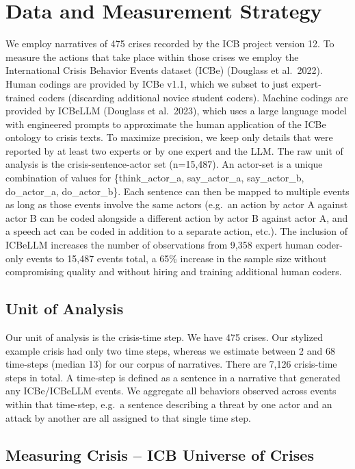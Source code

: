 \documentclass[
]{article}
\begin{document}
\section{Data and Measurement
Strategy}\label{data-and-measurement-strategy}

We employ narratives of 475 crises recorded by the ICB project version
12. To measure the actions that take place within those crises we employ
the International Crisis Behavior Events dataset (ICBe) (Douglass et
al.~2022). Human codings are provided by ICBe v1.1, which we subset to
just expert-trained coders (discarding additional novice student
coders). Machine codings are provided by ICBeLLM (Douglass et al.~2023),
which uses a large language model with engineered prompts to approximate
the human application of the ICBe ontology to crisis texts. To maximize
precision, we keep only details that were reported by at least two
experts or by one expert and the LLM. The raw unit of analysis is the
crisis-sentence-actor set (n=15,487). An actor-set is a unique
combination of values for \{think\_actor\_a, say\_actor\_a,
say\_actor\_b, do\_actor\_a, do\_actor\_b\}. Each sentence can then be
mapped to multiple events as long as those events involve the same
actors (e.g.~an action by actor A against actor B can be coded alongside
a different action by actor B against actor A, and a speech act can be
coded in addition to a separate action, etc.). The inclusion of ICBeLLM
increases the number of observations from 9,358 expert human coder-only
events to 15,487 events total, a 65\% increase in the sample size
without compromising quality and without hiring and training additional
human coders.

\subsection{Unit of Analysis}\label{unit-of-analysis}

Our unit of analysis is the crisis-time step. We have 475 crises. Our
stylized example crisis had only two time steps, whereas we estimate
between 2 and 68 time-steps (median 13) for our corpus of narratives.
There are 7,126 crisis-time steps in total. A time-step is defined as a
sentence in a narrative that generated any ICBe/ICBeLLM events. We
aggregate all behaviors observed across events within that time-step,
e.g.~a sentence describing a threat by one actor and an attack by
another are all assigned to that single time step.

\subsection{Measuring Crisis -- ICB Universe of
Crises}\label{measuring-crisis-icb-universe-of-crises}
\end{document}
